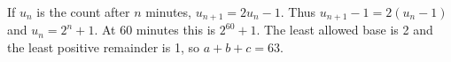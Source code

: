 If $u_n$ is the count after $n$ minutes, $u_{n+1}=2u_n-1$. Thus $u_{n+1}-1=2(u_n-1)$ and $u_n=2^n+1$. At 60 minutes this is $2^{60}+1$. The least allowed base is 2 and the least positive remainder is 1, so $\boxed{a+b+c=63}$.
